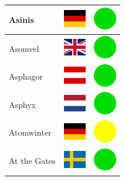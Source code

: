 \documentclass[12pt, a4paper, twoside]{report}
\begin{document}
\begin{center}
\begin{longtable}{|p{5cm}|p{2cm}|p{2cm}|}
Asinis & \includegraphics[width=1cm]{4x3/de} & \includegraphics[width=1cm]{likes/y} \\ \hline
Asomvel & \includegraphics[width=1cm]{4x3/gb} & \includegraphics[width=1cm]{likes/y} \\ \hline
Asphagor & \includegraphics[width=1cm]{4x3/at} & \includegraphics[width=1cm]{likes/y} \\ \hline
Asphyx & \includegraphics[width=1cm]{4x3/nl} & \includegraphics[width=1cm]{likes/y} \\ \hline
Atomwinter & \includegraphics[width=1cm]{4x3/de} & \includegraphics[width=1cm]{likes/m} \\ \hline
At the Gates & \includegraphics[width=1cm]{4x3/se} & \includegraphics[width=1cm]{likes/y} \\ \hline

\end{longtable}
\end{center}
\end{document}
